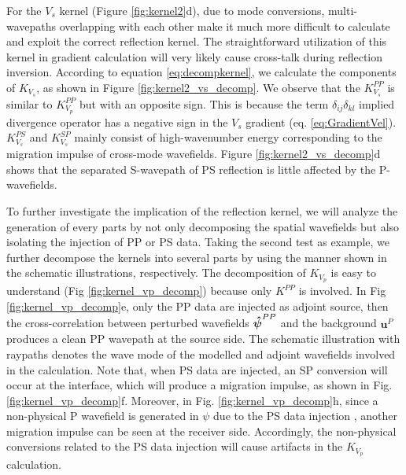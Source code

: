 For the $V_s$ kernel (Figure \ref{fig:kernel2}d), due to mode conversions, multi-wavepaths overlapping with each other 
make it much more difficult to calculate and exploit the correct reflection kernel. 
The straightforward utilization of this kernel in gradient calculation will very likely cause 
cross-talk during reflection inversion.
According to equation
\eqref{eq:decompkernel}, we calculate the components of $K_{V_s}$, as shown in Figure
\ref{fig:kernel2_vs_decomp}. We observe that the $K^{PP}_{V_s}$ is similar to $K^{PP}_{V_p}$ but with an opposite
sign. This is because the term $\delta_{ij}\delta_{kl}$ implied divergence operator has
a negative sign in the $V_s$ gradient (eq. \eqref{eq:GradientVel}).
$K^{PS}_{V_s}$ and $K^{SP}_{V_s}$ mainly consist of high-wavenumber energy
corresponding to the migration impulse of cross-mode wavefields. 
Figure \ref{fig:kernel2_vs_decomp}d shows that the
separated S-wavepath of PS reflection is little affected by the P-wavefields. 

To further investigate the implication of the reflection kernel, we will
analyze the generation of every parts by not only decomposing the spatial wavefields
but also isolating the injection of PP or PS data.
Taking the second test as example, we further decompose the kernels into 
several parts by using the manner shown in the schematic illustrations, respectively. 
The decomposition of $K_{V_p}$ is easy to understand 
(Fig \ref{fig:kernel_vp_decomp}) 
because only $K^{PP}$ is involved. In Fig
\ref{fig:kernel_vp_decomp}e, only the PP data are injected as adjoint source, then the
cross-correlation between
perturbed wavefields $\boldsymbol{{}\hat\psi}^{PP}$ and the background
$\mathbf{u}^P$ produces a clean PP wavepath at the source side. The	schematic
illustration with raypaths denotes the wave mode of
the modelled and adjoint wavefields involved in the calculation. Note that,
when PS data are injected, an SP conversion will
occur at the interface, which will produce a migration impulse, as shown in
Fig. \ref{fig:kernel_vp_decomp}f. Moreover, in
Fig. \ref{fig:kernel_vp_decomp}h, 
since a non-physical P wavefield is generated in $\psi$ due to the PS data injection
\cite[]{Ravasi2013}, 
another migration impulse can be seen at the receiver side. 
Accordingly, the non-physical conversions related to the PS data injection will
cause artifacts in the $K_{V_p}$ calculation. 

